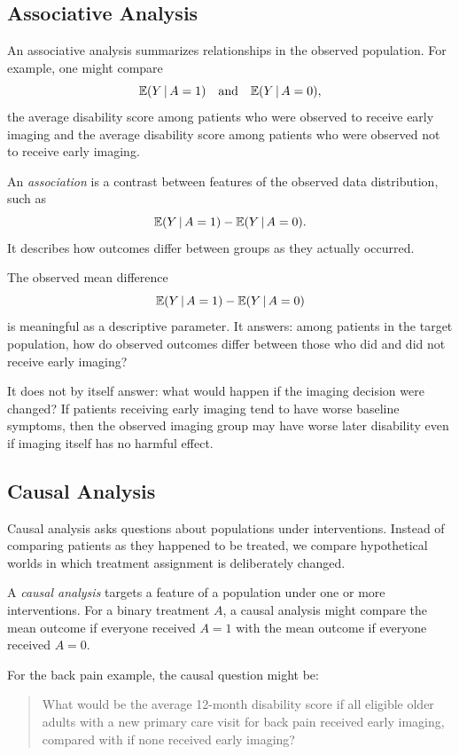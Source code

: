 \subsection{Associative Analysis}

An associative analysis summarizes relationships in the observed population. For example, one might compare
\[
\mathbb{E}(Y\,\vert\, A=1)
\quad\text{and}\quad
\mathbb{E}(Y\,\vert\, A=0),
\]
the average disability score among patients who were observed to receive early imaging and the average disability score among patients who were observed not to receive early imaging.

\begin{definition}[Association]
An \emph{association} is a contrast between features of the observed data distribution, such as
\[
\mathbb{E}(Y\,\vert\, A=1)-\mathbb{E}(Y\,\vert\, A=0).
\]
It describes how outcomes differ between groups as they actually occurred.
\end{definition}

The observed mean difference
\[
\mathbb{E}(Y\,\vert\, A=1)-\mathbb{E}(Y\,\vert\, A=0)
\]
is meaningful as a descriptive parameter. It answers: among patients in the target population, how do observed outcomes differ between those who did and did not receive early imaging?

It does not by itself answer: what would happen if the imaging decision were changed? If patients receiving early imaging tend to have worse baseline symptoms, then the observed imaging group may have worse later disability even if imaging itself has no harmful effect.

\subsection{Causal Analysis}

Causal analysis asks questions about populations under interventions. Instead of comparing patients as they happened to be treated, we compare hypothetical worlds in which treatment assignment is deliberately changed.

\begin{definition}
A \emph{causal analysis} targets a feature of a population under one or more interventions. For a binary treatment $A$, a causal analysis might compare the mean outcome if everyone received $A=1$ with the mean outcome if everyone received $A=0$.
\end{definition}

For the back pain example, the causal question might be:
\begin{quote}
What would be the average 12-month disability score if all eligible older adults with a new primary care visit for back pain received early imaging, compared with if none received early imaging?
\end{quote}


